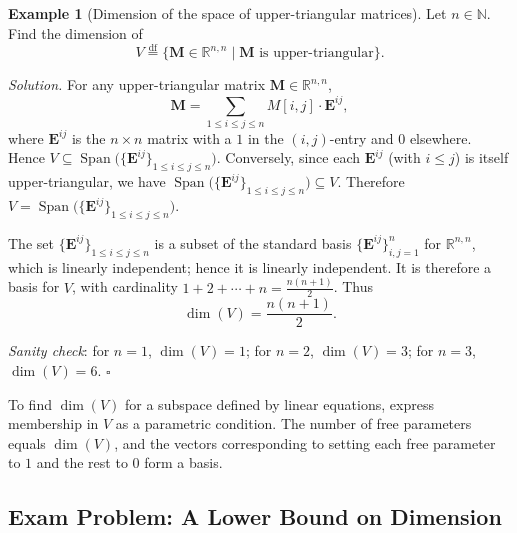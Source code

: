 \documentclass[11pt, a4paper, notitlepage]{report}
\theoremstyle{definition}
\newtheorem{example}[theorem]{Example}
\theoremstyle{remark}
\begin{document}
\begin{example}[Dimension of the space of upper-triangular matrices]\label{ex:dim-upper-triangular}
Let $n\in\mathbb{N}$. Find the dimension of
\[
  V \stackrel{\mathrm{df}}{=} \{\mathbf{M}\in\mathbb{R}^{n,n} \mid \mathbf{M} \text{ is upper-triangular}\}.
\]

\emph{Solution.} For any upper-triangular matrix $\mathbf{M}\in\mathbb{R}^{n,n}$,
\[
  \mathbf{M} = \sum_{1\le i\le j\le n} M[i,j]\cdot \mathbf{E}^{ij},
\]
where $\mathbf{E}^{ij}$ is the $n\times n$ matrix with a $1$ in the $(i,j)$-entry and $0$ elsewhere. Hence $V \subseteq \operatorname{Span}\bigl(\{\mathbf{E}^{ij}\}_{1\le i\le j\le n}\bigr)$. Conversely, since each $\mathbf{E}^{ij}$ (with $i\le j$) is itself upper-triangular, we have $\operatorname{Span}\bigl(\{\mathbf{E}^{ij}\}_{1\le i\le j\le n}\bigr)\subseteq V$. Therefore $V = \operatorname{Span}\bigl(\{\mathbf{E}^{ij}\}_{1\le i\le j\le n}\bigr)$.

The set $\{\mathbf{E}^{ij}\}_{1\le i\le j\le n}$ is a subset of the standard basis $\{\mathbf{E}^{ij}\}_{i,j=1}^n$ for $\mathbb{R}^{n,n}$, which is linearly independent; hence it is linearly independent. It is therefore a basis for $V$, with cardinality $1 + 2 + \cdots + n = \frac{n(n+1)}{2}$. Thus
\[
  \dim(V) = \frac{n(n+1)}{2}.
\]

\emph{Sanity check}: for $n=1$, $\dim(V)=1$; for $n=2$, $\dim(V)=3$; for $n=3$, $\dim(V)=6$. $\square$
\end{example}

\begin{examtip}[title={Exam Tip: Finding Dimensions via Parametric Forms}]
To find $\dim(V)$ for a subspace defined by linear equations, express membership in $V$ as a parametric condition. The number of free parameters equals $\dim(V)$, and the vectors corresponding to setting each free parameter to $1$ and the rest to $0$ form a basis.
\end{examtip}

\subsection{Exam Problem: A Lower Bound on Dimension}
\end{document}
